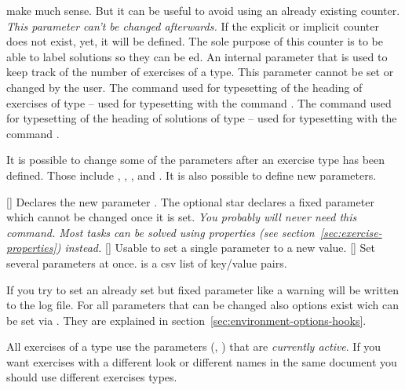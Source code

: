 \documentclass{xsim-manual}
\begin{document}
\begin{parameters}
    make much sense.  But it can be useful to avoid using an already existing
    counter. \emph{This parameter can't be changed afterwards.}  If the
    explicit or implicit counter does not exist, yet, it will be defined.  The
    sole purpose of this counter is to be able to label solutions so they can
    be ed.
    An internal parameter that is used to keep track of the number of
    exercises of a type.  This parameter cannot be set or changed by the
    user.
    The command used for typesetting of the heading of
    exercises of type  -- used for typesetting with the command
    .
    The command used for typesetting of the heading of
    solutions of type  -- used for typesetting with the command
    .
\end{parameters}

It is possible to change some of the parameters after an exercise type has
been defined.  Those include ,
, , and
.  It is also possible to define new parameters.
\begin{commands}
  [\sarg{}]
    Declares the new parameter .  The optional star declares a
    fixed parameter which cannot be changed once it is set.  \emph{You
      probably will never need this command.  Most tasks can be solved using
      properties (see section~\vref{sec:exercise-properties}) instead.}
  []
    Usable to set a single parameter to a new value.
  []
    Set several parameters at once.  is a csv list of
    key/value pairs.
\end{commands}
If you try to set an already set but fixed parameter like
 a warning will be written to the log file.  For all
parameters that can be changed also options exist wich can be set via
.  They are explained in
section~\vref{sec:environment-options-hooks}.

\begin{bewareofthedog}
  All exercises of a type use the parameters
  (\eg, ) that are \emph{currently active}.  If
  you want exercises with a different look or different names in the same
  document you should use different exercises types.
\end{bewareofthedog}
\end{document}
